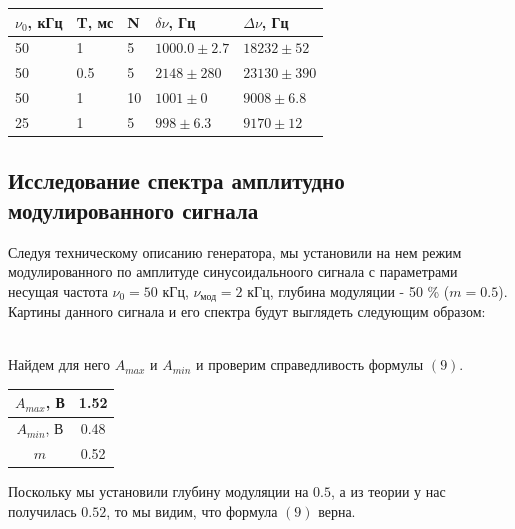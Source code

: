 \documentclass[a4paper,12pt]{article}
\begin{document}
\FloatBarrier

\begin{center}
\begin{tabular}{|l|l|l|l|l|}
\hline
$\nu_0$, кГц	& T, мс		& N	& $\delta \nu$, Гц	& $\Delta \nu$, Гц 	\\ \hline
50		& 1		& 5	& $1000.0 \pm 2.7$ 	& $18232 \pm 52$	\\ \hline
50		& 0.5		& 5	& $2148 \pm 280$ 	& $23130 \pm 390$	\\ \hline
50		& 1		& 10	& $1001 \pm 0$ 		& $9008 \pm 6.8$	\\ \hline
25		& 1		& 5	& $998 \pm 6.3$ 	& $9170 \pm 12$		\\ \hline
\end{tabular}
\end{center}



\subsection*{Исследование спектра амплитудно модулированного сигнала}
Следуя техническому описанию генератора, мы установили на нем режим модулированного по амплитуде синусоидальноого сигнала с параметрами несущая частота $\nu_0 = 50$ кГц, $\nu_{\text{мод}} = 2$ кГц, глубина модуляции - 50 \% ($m = 0.5$). Картины данного сигнала и его спектра будут выглядеть следующим образом:
\begin{figure}[h]
\centering
\end{figure}\\
Найдем для него $A_{max}$ и $A_{min}$ и проверим справедливость формулы $(9)$.
\begin{center}
\begin{tabular}{|c|c|}
\hline
$A_{max}$, В & 1.52 \\ \hline
$A_{min}$, В & 0.48 \\ \hline
$m$ & 0.52 \\ \hline
\end{tabular}
\end{center}
Поскольку мы установили глубину модуляции на $0.5$, а из теории у нас получилась $0.52$, то мы видим, что формула $(9)$ верна.
\end{document}
